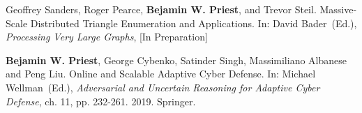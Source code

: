 \item Geoffrey Sanders, Roger Pearce, \textbf{Bejamin W. Priest}, and Trevor Steil.
	Massive-Scale Distributed Triangle Enumeration and Applications. 
        In:
        David Bader~(Ed.), \emph{Processing Very Large Graphs}, 
	[In Preparation]
	
\item \textbf{Bejamin W. Priest}, George Cybenko, Satinder Singh, Massimiliano Albanese and Peng Liu.
	Online and Scalable Adaptive Cyber Defense. 
        In:
        Michael Wellman~(Ed.), \emph{Adversarial and Uncertain Reasoning for Adaptive Cyber Defense}, ch.
        11, pp. 232-261. 
        2019. 
        Springer.

